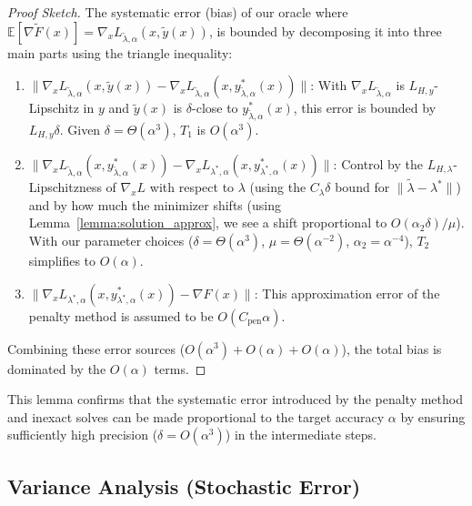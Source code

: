 \documentclass[letterpaper]{article} %
\newcommand{\1}{\mathbf{1}}
\begin{document}
\begin{proof}[Proof Sketch]
The systematic error (bias) of our oracle where $\mathbb{E}[\nabla\tilde{F}(x)] = \nabla_x L_{\tilde{\lambda},\alpha}(x, \tilde{y}(x))$, is bounded by decomposing it into three main parts using the triangle inequality:

\begin{enumerate}
    \item $\|\nabla_x L_{\tilde{\lambda},\alpha}(x, \tilde{y}(x)) - \nabla_x L_{\tilde{\lambda},\alpha}(x, y^*_{\tilde{\lambda},\alpha}(x))\|$: With $\nabla_x L_{\tilde{\lambda},\alpha}$ is $L_{H,y}$-Lipschitz in $y$ and $\tilde{y}(x)$ is $\delta$-close to $y^*_{\tilde{\lambda},\alpha}(x)$, this error is bounded by $L_{H,y}\delta$. Given $\delta=\Theta(\alpha^3)$, $T_1$ is $O(\alpha^3)$.

    \item $\|\nabla_x L_{\tilde{\lambda},\alpha}(x, y^*_{\tilde{\lambda},\alpha}(x)) - \nabla_x L_{\lambda^*,\alpha}(x, y^*_{\lambda^*,\alpha}(x))\|$: Control by the $L_{H,\lambda}$-Lipschitzness of $\nabla_x L$ with respect to $\lambda$ (using the $C_\lambda\delta$ bound for $\|\tilde{\lambda}-\lambda^*\|$) and by how much the minimizer shifts (using Lemma~\ref{lemma:solution_approx}, we see a shift proportional to $O(\alpha_2\delta)/\mu$). With our parameter choices ($\delta=\Theta(\alpha^3)$, $\mu=\Theta(\alpha^{-2})$, $\alpha_2=\alpha^{-4}$), $T_2$ simplifies to $O(\alpha)$.

    \item $\|\nabla_x L_{\lambda^*,\alpha}(x, y^*_{\lambda^*,\alpha}(x)) - \nabla F(x)\|$: This approximation error of the penalty method is assumed to be $O(C_{\text{pen}}\alpha)$.
\end{enumerate}
Combining these error sources ($O(\alpha^3) + O(\alpha) + O(\alpha)$), the total bias is dominated by the $O(\alpha)$ terms.
\end{proof}



This lemma confirms that the systematic error introduced by the penalty method and inexact solves can be made proportional to the target accuracy $\alpha$ by ensuring sufficiently high precision ($\delta=O(\alpha^3)$) in the intermediate steps.

\subsection{Variance Analysis (Stochastic Error)}
\end{document}
